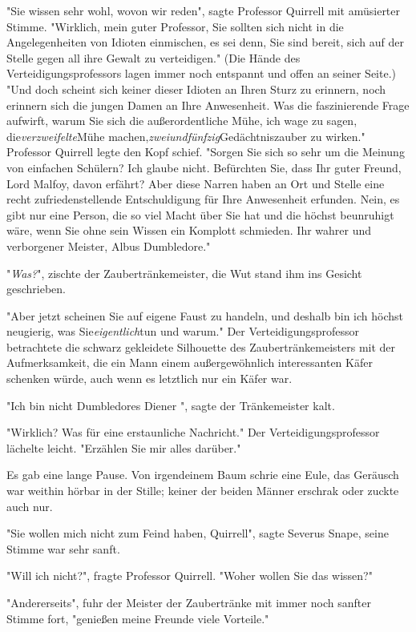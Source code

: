 {"Sie wissen sehr wohl, wovon wir reden", sagte Professor Quirrell mit amüsierter Stimme. "Wirklich, mein guter Professor, Sie sollten sich nicht in die Angelegenheiten von Idioten einmischen, es sei denn, Sie sind bereit, sich auf der Stelle gegen all ihre Gewalt zu verteidigen." (Die Hände des Verteidigungsprofessors lagen immer noch entspannt und offen an seiner Seite.) "Und doch scheint sich keiner dieser Idioten an Ihren Sturz zu erinnern, noch erinnern sich die jungen Damen an Ihre Anwesenheit. Was die faszinierende Frage aufwirft, warum Sie sich die außerordentliche Mühe, ich wage zu sagen, die\emph{verzweifelte}Mühe machen,\emph{zweiundfünfzig}Gedächtniszauber zu wirken." Professor Quirrell legte den Kopf schief. "Sorgen Sie sich so sehr um die Meinung von einfachen Schülern? Ich glaube nicht. Befürchten Sie, dass Ihr guter Freund, Lord Malfoy, davon erfährt? Aber diese Narren haben an Ort und Stelle eine recht zufriedenstellende Entschuldigung für Ihre Anwesenheit erfunden. Nein, es gibt nur eine Person, die so viel Macht über Sie hat und die höchst beunruhigt wäre, wenn Sie ohne sein Wissen ein Komplott schmieden. Ihr wahrer und verborgener Meister, Albus Dumbledore."

"\emph{Was?}", zischte der Zaubertränkemeister, die Wut stand ihm ins Gesicht geschrieben.

"Aber jetzt scheinen Sie auf eigene Faust zu handeln, und deshalb bin ich höchst neugierig, was Sie\emph{eigentlich}tun und warum." Der Verteidigungsprofessor betrachtete die schwarz gekleidete Silhouette des Zaubertränkemeisters mit der Aufmerksamkeit, die ein Mann einem außergewöhnlich interessanten Käfer schenken würde, auch wenn es letztlich nur ein Käfer war.

"Ich bin nicht Dumbledores Diener ", sagte der Tränkemeister kalt.

"Wirklich? Was für eine erstaunliche Nachricht." Der Verteidigungsprofessor lächelte leicht. "Erzählen Sie mir alles darüber."

Es gab eine lange Pause. Von irgendeinem Baum schrie eine Eule, das Geräusch war weithin hörbar in der Stille; keiner der beiden Männer erschrak oder zuckte auch nur.

"Sie wollen mich nicht zum Feind haben, Quirrell", sagte Severus Snape, seine Stimme war sehr sanft.

"Will ich nicht?", fragte Professor Quirrell. "Woher wollen Sie das wissen?"

"Andererseits", fuhr der Meister der Zaubertränke mit immer noch sanfter Stimme fort, "genießen meine Freunde viele Vorteile."

}
